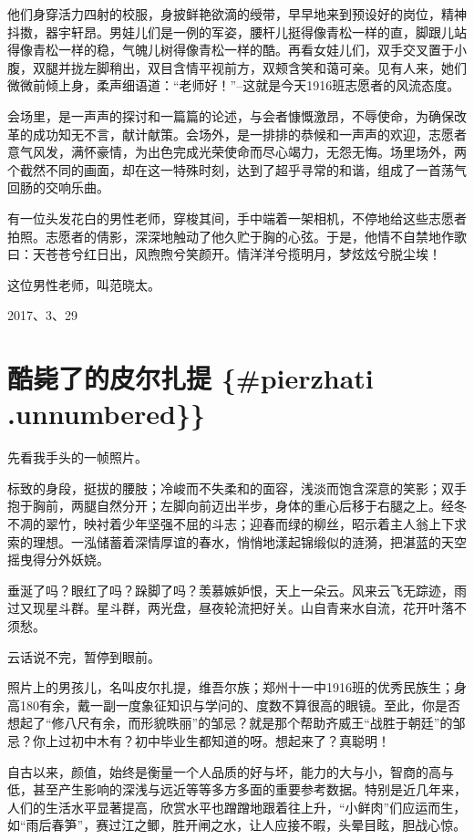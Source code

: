 \documentclass[openany]{ctexbook}
\begin{document}
他们身穿活力四射的校服，身披鲜艳欲滴的绶带，早早地来到预设好的岗位，精神抖擞，器宇轩昂。男娃儿们是一例的军姿，腰杆儿挺得像青松一样的直，脚跟儿站得像青松一样的稳，气魄儿树得像青松一样的酷。再看女娃儿们，双手交叉置于小腹，双腿并拢左脚稍出，双目含情平视前方，双颊含笑和蔼可亲。见有人来，她们微微前倾上身，柔声细语道：``老师好！''--这就是今天1916班志愿者的风流态度。

会场里，是一声声的探讨和一篇篇的论述，与会者慷慨激昂，不辱使命，为确保改革的成功知无不言，献计献策。会场外，是一排排的恭候和一声声的欢迎，志愿者意气风发，满怀豪情，为出色完成光荣使命而尽心竭力，无怨无悔。场里场外，两个截然不同的画面，却在这一特殊时刻，达到了超乎寻常的和谐，组成了一首荡气回肠的交响乐曲。

有一位头发花白的男性老师，穿梭其间，手中端着一架相机，不停地给这些志愿者拍照。志愿者的倩影，深深地触动了他久贮于胸的心弦。于是，他情不自禁地作歌曰：天苍苍兮红日出，风煦煦兮笑颜开。情洋洋兮揽明月，梦炫炫兮脱尘埃！

这位男性老师，叫范晓太。

2017、3、29

\chapter{酷毙了的皮尔扎提 \{\#pierzhati
.unnumbered\}\}}\label{-pierzhati-.unnumbered}

先看我手头的一帧照片。

标致的身段，挺拔的腰肢；冷峻而不失柔和的面容，浅淡而饱含深意的笑影；双手抱于胸前，两腿自然分开；左脚向前迈出半步，身体的重心后移于右腿之上。经冬不凋的翠竹，映衬着少年坚强不屈的斗志；迎春而绿的柳丝，昭示着主人翁上下求索的理想。一泓储蓄着深情厚谊的春水，悄悄地漾起锦缎似的涟漪，把湛蓝的天空摇曳得分外妖娆。

垂涎了吗？眼红了吗？跺脚了吗？羡慕嫉妒恨，天上一朵云。风来云飞无踪迹，雨过又现星斗群。星斗群，两光盘，昼夜轮流把好关。山自青来水自流，花开叶落不须愁。

云话说不完，暂停到眼前。

照片上的男孩儿，名叫皮尔扎提，维吾尔族；郑州十一中1916班的优秀民族生；身高180有余，戴一副一度象征知识与学问的、度数不算很高的眼镜。至此，你是否想起了``修八尺有余，而形貌昳丽''的邹忌？就是那个帮助齐威王``战胜于朝廷''的邹忌？你上过初中木有？初中毕业生都知道的呀。想起来了？真聪明！

自古以来，颜值，始终是衡量一个人品质的好与坏，能力的大与小，智商的高与低，甚至产生影响的深浅与远近等等多方多面的重要参考数据。特别是近几年来，人们的生活水平显著提高，欣赏水平也蹭蹭地跟着往上升，``小鲜肉''们应运而生，如``雨后春笋''，赛过江之鲫，胜开闸之水，让人应接不暇，头晕目眩，胆战心惊。
\end{document}
